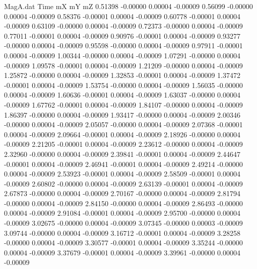 \begin{filecontents}{MagA.dat}
Time mX mY mZ
   0.51398   -0.00000    0.00004   -0.00009
   0.56099   -0.00000    0.00004   -0.00009
   0.58376   -0.00001    0.00004   -0.00009
   0.60778   -0.00001    0.00004   -0.00009
   0.63109   -0.00000    0.00004   -0.00009
   0.72373   -0.00000    0.00004   -0.00009
   0.77011   -0.00001    0.00004   -0.00009
   0.90976   -0.00001    0.00004   -0.00009
   0.93277   -0.00000    0.00004   -0.00009
   0.95598   -0.00000    0.00004   -0.00009
   0.97911   -0.00001    0.00004   -0.00009
   1.00344   -0.00000    0.00004   -0.00009
   1.07291   -0.00000    0.00004   -0.00009
   1.09578   -0.00001    0.00004   -0.00009
   1.21209   -0.00000    0.00004   -0.00009
   1.25872   -0.00000    0.00004   -0.00009
   1.32853   -0.00001    0.00004   -0.00009
   1.37472   -0.00001    0.00004   -0.00009
   1.53754   -0.00000    0.00004   -0.00009
   1.56035   -0.00000    0.00004   -0.00009
   1.60636   -0.00001    0.00004   -0.00009
   1.63037   -0.00000    0.00004   -0.00009
   1.67762   -0.00001    0.00004   -0.00009
   1.84107   -0.00000    0.00004   -0.00009
   1.86397   -0.00000    0.00004   -0.00009
   1.93417   -0.00000    0.00004   -0.00009
   2.00346   -0.00000    0.00004   -0.00009
   2.05057   -0.00000    0.00004   -0.00009
   2.07368   -0.00001    0.00004   -0.00009
   2.09664   -0.00001    0.00004   -0.00009
   2.18926   -0.00000    0.00004   -0.00009
   2.21205   -0.00001    0.00004   -0.00009
   2.23612   -0.00000    0.00004   -0.00009
   2.32960   -0.00000    0.00004   -0.00009
   2.39841   -0.00001    0.00004   -0.00009
   2.44647   -0.00001    0.00004   -0.00009
   2.46941   -0.00001    0.00004   -0.00009
   2.49214   -0.00000    0.00004   -0.00009
   2.53923   -0.00001    0.00004   -0.00009
   2.58509   -0.00001    0.00004   -0.00009
   2.60802   -0.00000    0.00004   -0.00009
   2.63139   -0.00001    0.00004   -0.00009
   2.67873   -0.00000    0.00004   -0.00009
   2.70167   -0.00000    0.00004   -0.00009
   2.81794   -0.00000    0.00004   -0.00009
   2.84150   -0.00000    0.00004   -0.00009
   2.86493   -0.00000    0.00004   -0.00009
   2.91084   -0.00001    0.00004   -0.00009
   2.95700   -0.00000    0.00004   -0.00009
   3.02675   -0.00000    0.00004   -0.00009
   3.07345   -0.00000    0.00003   -0.00009
   3.09744   -0.00000    0.00004   -0.00009
   3.16712   -0.00001    0.00004   -0.00009
   3.28258   -0.00000    0.00004   -0.00009
   3.30577   -0.00001    0.00004   -0.00009
   3.35244   -0.00000    0.00004   -0.00009
   3.37679   -0.00001    0.00004   -0.00009
   3.39961   -0.00000    0.00004   -0.00009

\end{filecontents}

